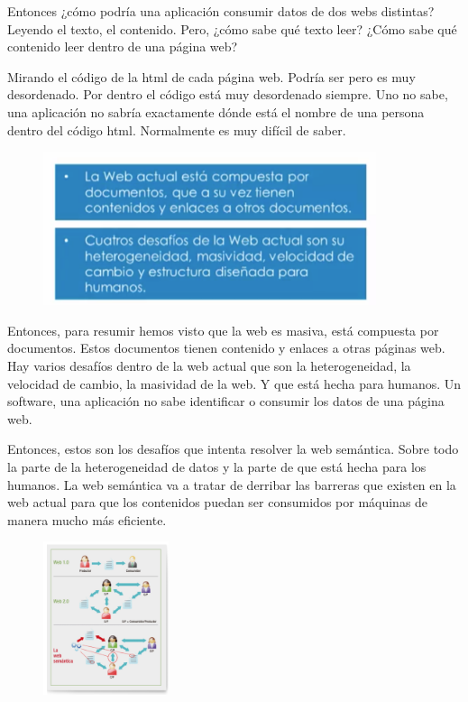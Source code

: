  Entonces ¿cómo podría una aplicación consumir datos de dos webs distintas? Leyendo el texto, el contenido. Pero, ¿cómo sabe qué texto leer? ¿Cómo sabe qué contenido leer dentro de una página web?
 
 Mirando el código de la html de cada página web. Podría ser pero es muy desordenado. Por dentro el código está muy desordenado siempre. Uno no sabe, una aplicación no sabría exactamente dónde está el nombre de una persona dentro del código html. Normalmente es muy difícil de saber.
 
  \begin{figure}[H]
 	\centering
 	\includegraphics[height=4.5cm]{imagenes/capitulo3/3}
 	\caption{}
 \end{figure}

Entonces, para resumir hemos visto que la web es masiva, está compuesta por documentos. Estos documentos tienen contenido y enlaces a otras páginas web. Hay varios desafíos dentro de la web actual que son la heterogeneidad, la velocidad de cambio, la masividad de la web. Y que está hecha para humanos. Un software, una aplicación no sabe identificar o consumir los datos de una página web.

Entonces, estos son los desafíos que intenta resolver la web semántica. Sobre todo la parte de la heterogeneidad de datos y la parte de que está hecha para los humanos. La web semántica va a tratar de derribar las barreras que existen en la web actual para que los contenidos puedan ser consumidos por máquinas de manera mucho más eficiente.



\begin{figure}[H]
	\centering
	\includegraphics[height=4.5cm]{imagenes/capitulo3/10}
	\caption{}
\end{figure}

